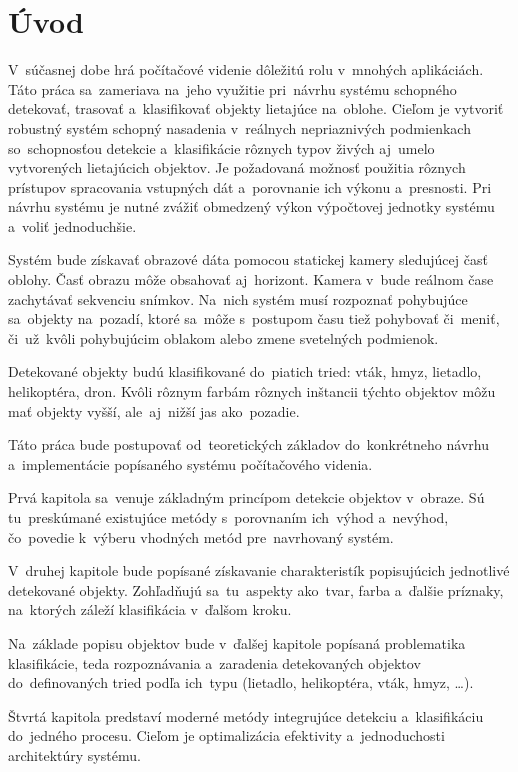\chapter*{Úvod}
{}

V~súčasnej dobe hrá počítačové videnie dôležitú rolu v~mnohých aplikáciách. Táto práca sa~zameriava na~jeho využitie pri~návrhu systému schopného detekovať, trasovať a~klasifikovať objekty lietajúce na~oblohe. Cieľom je vytvoriť robustný systém schopný nasadenia v~reálnych nepriaznivých podmienkach so~schopnosťou detekcie a~klasifikácie rôznych typov živých aj~umelo vytvorených lietajúcich objektov. Je požadovaná možnosť použitia rôznych prístupov spracovania vstupných dát a~porovnanie ich výkonu a~presnosti. Pri návrhu systému je nutné zvážiť obmedzený výkon výpočtovej jednotky systému a~voliť jednoduchšie.

Systém bude získavať obrazové dáta pomocou statickej kamery sledujúcej časť oblohy. Časť obrazu môže obsahovať aj~horizont. Kamera v~bude reálnom čase zachytávať sekvenciu snímkov. Na~nich systém musí rozpoznať pohybujúce sa~objekty na~pozadí, ktoré sa~môže s~postupom času tiež pohybovať či~meniť, či~už~kvôli pohybujúcim oblakom alebo zmene svetelných podmienok.

Detekované objekty budú klasifikované do~piatich tried: vták, hmyz, lietadlo, helikoptéra, dron. Kvôli rôznym farbám rôznych inštancii týchto objektov môžu mať objekty vyšší, ale~aj~nižší jas ako~pozadie.

Táto práca bude postupovať od~teoretických základov do~konkrétneho návrhu a~implementácie popísaného systému počítačového videnia.

Prvá kapitola sa~venuje základným princípom detekcie objektov v~obraze. Sú tu~preskúmané existujúce metódy s~porovnaním ich~výhod a~nevýhod, čo~povedie k~výberu vhodných metód pre~navrhovaný systém.

V~druhej kapitole bude popísané získavanie charakteristík popisujúcich jednotlivé detekované objekty. Zohľadňujú sa~tu~aspekty ako~tvar, farba a~ďalšie príznaky, na~ktorých záleží klasifikácia v~ďalšom kroku.

Na~základe popisu objektov bude v~ďalšej kapitole popísaná problematika klasifikácie, teda rozpoznávania a~zaradenia detekovaných objektov do~definovaných tried podľa ich~typu (lietadlo, helikoptéra, vták, hmyz, \dots).

Štvrtá kapitola predstaví moderné metódy integrujúce detekciu a~klasifikáciu do~jedného procesu. Cieľom je optimalizácia efektivity a~jednoduchosti architektúry systému.

